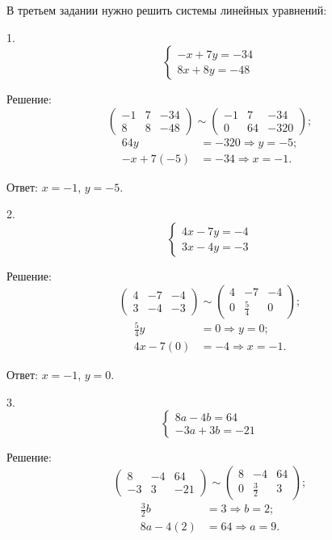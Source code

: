 \documentclass[14pt,a4paper]{extarticle}
\begin{document}
В третьем задании нужно решить системы линейных уравнений:

1.
\[
\begin{cases} 
-x + 7y = -34 \\ 
8x + 8y = -48 
\end{cases}
\]

Решение:
\[
\left(\begin{array}{cc|c}
-1 & 7 & -34 \\
8 & 8 & -48
\end{array}\right)
\sim
\left(\begin{array}{cc|c}
-1 & 7 & -34 \\
0 & 64 & -320
\end{array}\right)
;\]
\begin{align*}
    64y &= -320 \Rightarrow y = -5; \\
    -x + 7(-5) &= -34 \Rightarrow x = -1.
    \end{align*}

Ответ: \( x = -1 \), \( y = -5 \).

2.
\[
\begin{cases} 
4x - 7y = -4 \\ 
3x - 4y = -3 
\end{cases}
\]

Решение:
\[
\left(\begin{array}{cc|c}
4 & -7 & -4 \\
3 & -4 & -3
\end{array}\right)
\sim
\left(\begin{array}{cc|c}
4 & -7 & -4 \\
0 & \frac{5}{4} & 0
\end{array}\right)
;\]
\begin{align*}
    \frac{5}{4}y &= 0 \Rightarrow y = 0; \\
    4x - 7(0) &= -4 \Rightarrow x = -1.
    \end{align*}

Ответ: \( x = -1 \), \( y = 0 \).

3.
\[
\begin{cases} 
8a - 4b = 64 \\ 
-3a + 3b = -21 
\end{cases}
\]

Решение:
\[
\left(\begin{array}{cc|c}
8 & -4 & 64 \\
-3 & 3 & -21
\end{array}\right)
\sim
\left(\begin{array}{cc|c}
8 & -4 & 64 \\
0 & \frac{3}{2} & 3
\end{array}\right)
;\]
\begin{align*}
    \frac{3}{2}b &= 3 \Rightarrow b = 2; \\
    8a - 4(2) &= 64 \Rightarrow a = 9.
    \end{align*}
\end{document}
